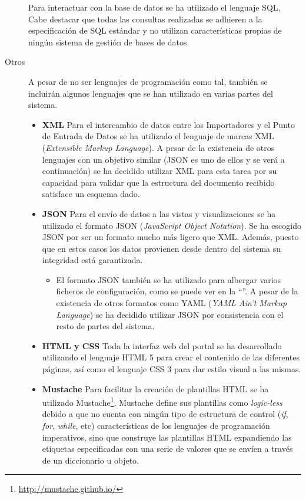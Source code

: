\begin{description}
			Para interactuar con la base de datos se ha utilizado el lenguaje SQL, Cabe destacar que todas las consultas realizadas se adhieren a la especificación de SQL estándar y no utilizan características propias de ningún sistema de gestión de bases de datos.
		\item[Otros]
			A pesar de no ser lenguajes de programación como tal, también se incluirán algunos lenguajes que se han utilizado en varias partes del sistema.
			\begin{itemize}
				\item \textbf{XML}
					Para el intercambio de datos entre los Importadores y el Punto de Entrada de Datos se ha utilizado el lenguaje de marcas XML (\textit{Extensible Markup Language}).  A pesar de la existencia de otros lenguajes con un objetivo similar (JSON es uno de ellos y se verá a continuación) se ha decidido utilizar XML para esta tarea por su capacidad para validar que la estructura del documento recibido satisface un esquema dado.
				\item \textbf{JSON}
					Para el envío de datos a las vistas y visualizaciones se ha utilizado el formato JSON (\textit{JavaScript Object Notation}).  Se ha escogido JSON por ser un formato mucho más ligero que XML.  Además, puesto que en estos casos los datos provienen desde dentro del sistema su integridad está garantizada.
						\begin{itemize}
							\item
								El formato JSON también se ha utilizado para albergar varios ficheros de configuración, como se puede ver en la ``''.  A pesar de la existencia de otros formatos como YAML (\textit{YAML Ain't Markup Language}) se ha decidido utilizar JSON por consistencia con el resto de partes del sistema.
						\end{itemize}
					
				\item \textbf{HTML y CSS}
					Toda la interfaz web del portal se ha desarrollado utilizando el lenguaje HTML 5 para crear el contenido de las diferentes páginas, así como el lenguaje CSS 3 para dar estilo visual a las mismas.
					
				\item \textbf{Mustache}
					Para facilitar la creación de plantillas HTML se ha utilizado Mustache\footnote{\url{http://mustache.github.io/}}.  Mustache define sus plantillas como \textit{logic-less} debido a que no cuenta con ningún tipo de estructura de control (\textit{if}, \textit{for}, \textit{while}, etc) características de los lenguajes de programación imperativos, sino que construye las plantillas HTML expandiendo las etiquetas especificadas con una serie de valores que se envíen a través de un diccionario u objeto.
			\end{itemize}
	\end{description}


